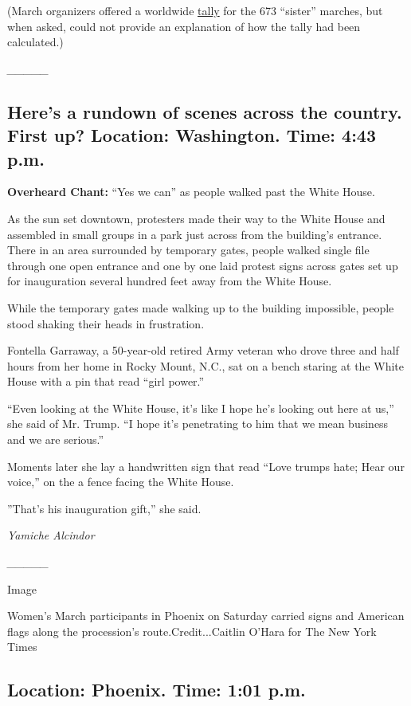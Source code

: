 (March organizers offered a worldwide
\href{https://www.womensmarch.com/sisters}{tally} for the 673 ``sister''
marches, but when asked, could not provide an explanation of how the
tally had been calculated.)

\emph{\_\_\_\_\_}

\hypertarget{heres-a-rundown-of-scenes-across-the-country-first-up-location-washington-time-443-pm}{%
\subsection{Here's a rundown of scenes across the country. First up?
Location: Washington. Time: 4:43
p.m.}\label{heres-a-rundown-of-scenes-across-the-country-first-up-location-washington-time-443-pm}}

\textbf{Overheard Chant:} ``Yes we can'' as people walked past the White
House.

As the sun set downtown, protesters made their way to the White House
and assembled in small groups in a park just across from the building's
entrance. There in an area surrounded by temporary gates, people walked
single file through one open entrance and one by one laid protest signs
across gates set up for inauguration several hundred feet away from the
White House.

While the temporary gates made walking up to the building impossible,
people stood shaking their heads in frustration.

Fontella Garraway, a 50-year-old retired Army veteran who drove three
and half hours from her home in Rocky Mount, N.C., sat on a bench
staring at the White House with a pin that read ``girl power.''

``Even looking at the White House, it's like I hope he's looking out
here at us,'' she said of Mr. Trump. ``I hope it's penetrating to him
that we mean business and we are serious.''

Moments later she lay a handwritten sign that read ``Love trumps hate;
Hear our voice,'' on the a fence facing the White House.

''That's his inauguration gift,'' she said.

\emph{Yamiche Alcindor}

\emph{\_\_\_\_\_}

Image

Women's March participants in Phoenix on Saturday carried signs and
American flags along the procession's route.Credit...Caitlin O'Hara for
The New York Times

\hypertarget{location-phoenix-time-101-pm}{%
\subsection{Location: Phoenix. Time: 1:01
p.m.}\label{location-phoenix-time-101-pm}}

